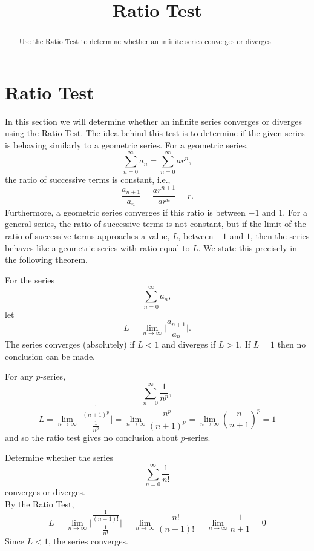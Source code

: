 \documentclass{ximera}
\title{Ratio Test}
\begin{document}
\begin{abstract}
Use the Ratio Test to determine whether an infinite series converges or diverges.
\end{abstract}

\maketitle

\section{Ratio Test}

In this section we will determine whether an infinite series converges or diverges using the Ratio Test. 
The idea behind this test is to determine if the given series is behaving similarly to a geometric series.
For a geometric series, 
\[
\sum_{n=0}^\infty a_n = \sum_{n=0}^\infty ar^n,
\]
the ratio of successive terms is constant, i.e., 
\[
\frac{a_{n+1}}{a_n} = \frac{ar^{n+1}}{ar^n} = r.
\]
Furthermore, a geometric series converges if this ratio is between $-1$ and $1$.
For a general series, the ratio of successive terms is not constant, but if the limit of the ratio of successive terms
approaches a value, $L$, between $-1$ and $1$, then the series behaves like a geometric series with ratio equal to $L$.
We state this precisely in the following theorem.

\begin{theorem}
For the series
\[
\sum_{n=0}^\infty a_n,
\]
let
\[
L = \lim_{n \to \infty} \bigg|\frac{a_{n+1}}{a_n}\bigg|.
\]
The series converges (absolutely) if $L < 1$ and diverges if $L>1$. 
If $L = 1$ then no conclusion can be made.

\end{theorem}
 
\begin{remark}
For any $p$-series,
\[
\sum_{n=0}^\infty \frac{1}{n^p},
\]
\[
L =  \lim_{n \to \infty} \bigg|\frac{\frac{1}{(n+1)^p}}{\frac{1}{n^p}}\bigg| = \lim_{n \to \infty} \frac{n^p}{(n+1)^p} =  \lim_{n \to \infty} \left(\frac{n}{n+1}\right)^p = 1
\]
and so the ratio test gives no conclusion about $p$-series.
\end{remark}

\begin{example}
Determine whether the series
\[
\sum_{n=0}^\infty \frac{1}{n!}
\]
converges or diverges.\\
By the Ratio Test,
\[
L =  \lim_{n \to \infty} \bigg|\frac{\frac{1}{(n+1)!}}{\frac{1}{n!}}\bigg| =  \lim_{n \to \infty} \frac{n!}{(n+1)!} =  \lim_{n \to \infty} \frac{1}{n+1} = 0
\]
Since $L < 1$, the series converges.
\end{example}
\end{document}
